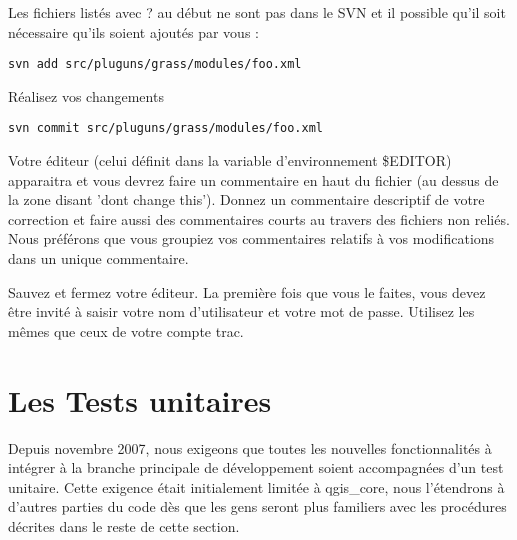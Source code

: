Les fichiers list\'es avec ? au d\'ebut ne sont pas dans le SVN et il possible qu'il soit n\'ecessaire qu'ils soient ajout\'es par vous :

\begin{verbatim}
svn add src/pluguns/grass/modules/foo.xml
\end{verbatim}

R\'ealisez vos changements

\begin{verbatim}
svn commit src/pluguns/grass/modules/foo.xml
\end{verbatim}

Votre \'editeur (celui d\'efinit dans la variable d'environnement \$EDITOR) apparaitra et vous devrez faire un commentaire en haut du fichier (au dessus de la zone disant 'dont change this'). Donnez un commentaire descriptif de votre correction et faire aussi des commentaires courts au travers des fichiers non reli\'es. Nous pr\'ef\'erons que vous groupiez vos commentaires relatifs \`a vos modifications dans un unique commentaire.

Sauvez et fermez votre \'editeur. La premi\`ere fois que vous le faites, vous devez \^etre invit\'e \`a saisir votre nom d'utilisateur et votre mot de passe. Utilisez les m\^emes que ceux de votre compte trac.

\section{Les Tests unitaires}
Depuis novembre 2007, nous exigeons que toutes les nouvelles fonctionnalit\'es \`a int\'egrer \`a la branche principale de d\'eveloppement soient accompagn\'ees d'un test unitaire. Cette exigence \'etait initialement limit\'ee \`a qgis\_core, nous l'\'etendrons \`a d'autres parties du code d\`es que les gens seront plus familiers avec les proc\'edures d\'ecrites dans le reste de cette section.

